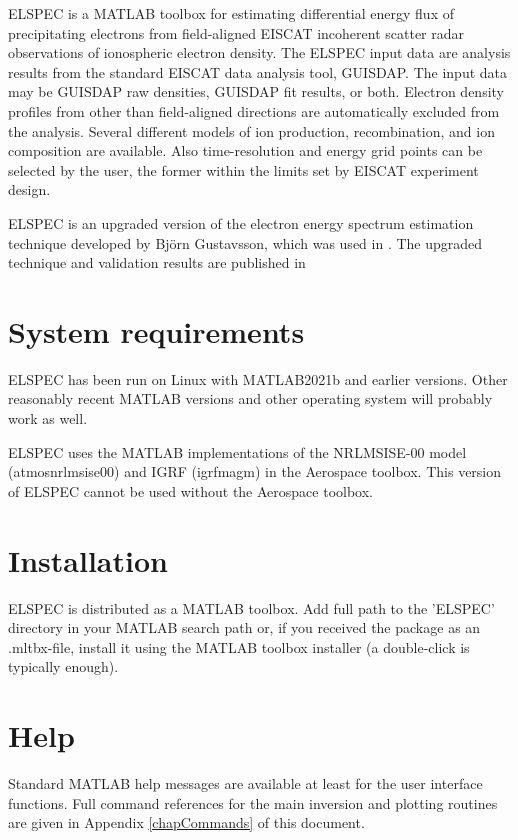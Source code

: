 \documentclass[12pt,a4paper]{report}
\begin{document}
ELSPEC is a MATLAB toolbox for estimating differential energy flux of precipitating electrons from field-aligned EISCAT incoherent scatter radar observations of ionospheric electron density. The ELSPEC input data are analysis results from the standard EISCAT data analysis tool, GUISDAP. The input data may be GUISDAP raw densities, GUISDAP fit results, or both. %
Electron density profiles from other than field-aligned directions are automatically excluded from the analysis. Several different models of ion production, recombination, and ion composition are available. Also time-resolution and energy grid points can be selected by the user, the former within the limits set by EISCAT experiment design. 


ELSPEC is an upgraded version of the electron energy spectrum estimation technique developed by Bj{\"o}rn Gustavsson, which was used in \citep{dahlgren2011}. The upgraded technique and validation results are published in \citep{virtanen2018}

\section{System requirements}

ELSPEC has been run on Linux with MATLAB2021b and earlier versions. Other reasonably recent MATLAB versions and other operating system will probably work as well. 

ELSPEC uses the MATLAB implementations of the NRLMSISE-00 model (atmosnrlmsise00) and IGRF (igrfmagm) in the Aerospace toolbox. This version of ELSPEC cannot be used without the Aerospace toolbox. 

\section{Installation}

ELSPEC is distributed as a MATLAB toolbox. Add full path to the 'ELSPEC' directory in your MATLAB search path or, if you received the package as an .mltbx-file, install it using the MATLAB toolbox installer (a double-click is typically enough).


\section{Help}\label{help}

Standard MATLAB help messages are available at least for the user interface functions. Full command references for the main inversion and plotting routines are given in Appendix \ref{chapCommands} of this document. 
\end{document}
